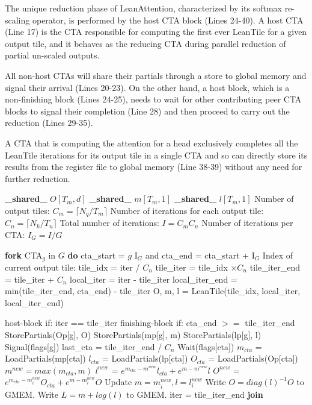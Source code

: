 The unique reduction phase of LeanAttention, characterized by its softmax re-scaling operator, is performed by the host CTA block (Lines 24-40). A host CTA (Line 17) is the CTA responsible for computing the first ever LeanTile for a given output tile, and it behaves as the reducing CTA during parallel reduction of partial un-scaled outputs. 

All non-host CTAs will share their partials through a store to global memory and signal their arrival (Lines 20-23). On the other hand, a host block, which is a non-finishing block (Lines 24-25), needs to wait for other contributing peer CTA blocks to signal their completion (Line 28) and then proceed to carry out the reduction (Lines 29-35). 

A CTA that is computing the attention for a head exclusively completes all the LeanTile iterations for its output tile in a single CTA and so can directly store its results from the register file to global memory (Line 38-39) without any need for further reduction.

\begin{algorithm}[tb]
   \caption{Lean Attention}
   \label{alg:leanattnalgstreamK}
\begin{algorithmic}[1] 
\STATE \textbf{\_shared\_} $O[T_m, d]$
\STATE \textbf{\_shared\_} $m[T_m, 1]$
\STATE \textbf{\_shared\_} $l[T_m, 1]$
\STATE Number of output tiles: $C_m = \lceil N_q / T_m \rceil$
\STATE Number of iterations for each output tile: $C_n = \lceil N_k / T_n \rceil$
\STATE Total number of iterations: $I = C_m C_n$
\STATE Number of iterations per CTA: $I_G = I / G$

\STATE \textbf{fork} CTA$_g$ in $G$ \textbf{do}
\STATE cta\_start = $g$ I$_G$ and cta\_end = cta\_start + I$_G$
\STATE Index of current output tile: tile\_idx = iter / $C_n$
\STATE tile\_iter = tile\_idx $\times C_n$ 
\STATE tile\_iter\_end = tile\_iter + $C_n$
\STATE local\_iter = iter - tile\_iter
\STATE local\_iter\_end = min(tile\_iter\_end, cta\_end) - tile\_iter
\STATE O, m, l = LeanTile(tile\_idx, local\_iter, local\_iter\_end)

\STATE host-block if: iter == tile\_iter
\STATE finishing-block if: cta\_end $>=$ tile\_iter\_end
\STATE StorePartials(Op[g], O) \STATE StorePartials(mp[g], m) \STATE StorePartials(lp[g], l) \STATE Signal(flags[g])
\ELSE
{}
\STATE last\_cta = tile\_iter\_end / $C_n$
\STATE Wait(flags[cta])
\STATE $m_{cta}$ = LoadPartials(mp[cta])
\STATE $l_{cta}$ = LoadPartials(lp[cta])
\STATE $O_{cta}$ = LoadPartials(Op[cta])
\STATE $m^{new} = max(m_{cta}, m)$
\STATE $l^{new}$ = $e^{m_{cta} - m^{new}}l_{cta} + e^{m - m^{new}}l$
\STATE $O^{new}$ = $e^{m_{cta} - m_i^{new}}O_{cta} + e^{m - m_i^{new}}O$
\STATE Update $m = m_i^{new}, l = l_i^{new}$
\ENDFOR
\ENDIF \STATE Write $O = diag(l)^{-1}O$ to GMEM.
\STATE Write $L = m + log(l)$ to GMEM.
\ENDIF
\STATE iter = tile\_iter\_end
\ENDFOR 
\STATE \textbf{join}
\end{algorithmic}
\end{algorithm}

